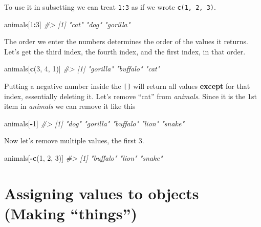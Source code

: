 \documentclass[
  12pt,
]{book}
\newenvironment{Shaded}{\begin{snugshade}}{\end{snugshade}}
\newcommand{\CommentTok}[1]{\textcolor[rgb]{0.37,0.37,0.37}{\textit{#1}}}
\newcommand{\DecValTok}[1]{\textcolor[rgb]{0.06,0.06,0.06}{#1}}
\newcommand{\KeywordTok}[1]{\textcolor[rgb]{0.27,0.27,0.27}{\textbf{#1}}}
\newcommand{\NormalTok}[1]{#1}
\newcommand{\OperatorTok}[1]{\textcolor[rgb]{0.43,0.43,0.43}{\textbf{#1}}}
\begin{document}
To use it in subsetting we can treat \texttt{1:3} as if we wrote \texttt{c(1,\ 2,\ 3)}.

\begin{Shaded}
\begin{Highlighting}[]
\NormalTok{animals[}\DecValTok{1}\OperatorTok{:}\DecValTok{3}\NormalTok{]}
\CommentTok{\#> [1] "cat"     "dog"     "gorilla"}
\end{Highlighting}
\end{Shaded}

The order we enter the numbers determines the order of the values it returns. Let's get the third index, the fourth index, and the first index, in that order.

\begin{Shaded}
\begin{Highlighting}[]
\NormalTok{animals[}\KeywordTok{c}\NormalTok{(}\DecValTok{3}\NormalTok{, }\DecValTok{4}\NormalTok{, }\DecValTok{1}\NormalTok{)]}
\CommentTok{\#> [1] "gorilla" "buffalo" "cat"}
\end{Highlighting}
\end{Shaded}

Putting a negative number inside the \texttt{{[}{]}} will return all values \textbf{except} for that index, essentially deleting it. Let's remove ``cat'' from \emph{animals}. Since it is the 1st item in \emph{animals} we can remove it like this

\begin{Shaded}
\begin{Highlighting}[]
\NormalTok{animals[}\OperatorTok{{-}}\DecValTok{1}\NormalTok{]}
\CommentTok{\#> [1] "dog"     "gorilla" "buffalo" "lion"    "snake"}
\end{Highlighting}
\end{Shaded}

Now let's remove multiple values, the first 3.

\begin{Shaded}
\begin{Highlighting}[]
\NormalTok{animals[}\OperatorTok{{-}}\KeywordTok{c}\NormalTok{(}\DecValTok{1}\NormalTok{, }\DecValTok{2}\NormalTok{, }\DecValTok{3}\NormalTok{)]}
\CommentTok{\#> [1] "buffalo" "lion"    "snake"}
\end{Highlighting}
\end{Shaded}

\hypertarget{assignment}{%
\section{Assigning values to objects (Making ``things'')}\label{assignment}}
\end{document}
